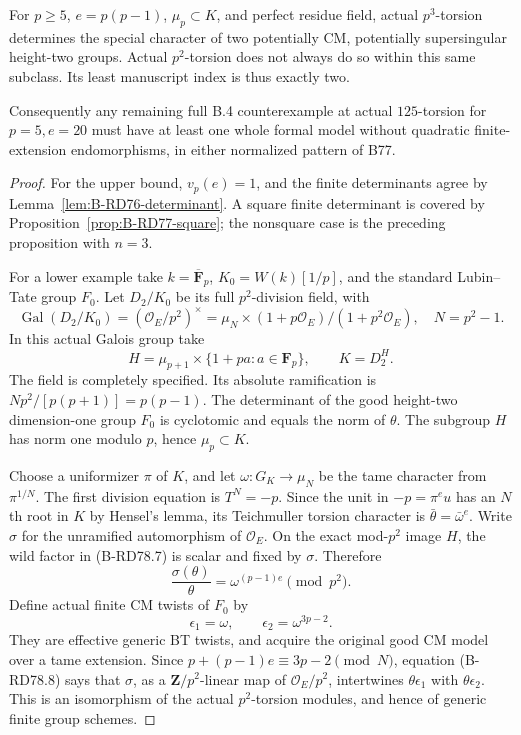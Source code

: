 \begin{theorem}
\label{thm:B-RD78}
For \(p\ge5\), \(e=p(p-1)\), \(\mu_p\subset K\), and
perfect residue field, actual \(p^3\)-torsion determines the
special character of two potentially CM, potentially supersingular
height-two groups. Actual \(p^2\)-torsion does not always do so
within this same subclass. Its least manuscript index is thus
exactly two.

Consequently any remaining full B.4 counterexample at actual
\(125\)-torsion for \(p=5,e=20\) must have at least one
whole formal model without quadratic finite-extension
endomorphisms, in either normalized pattern of B77.
\end{theorem}
\begin{proof}
For the upper bound, \(v_p(e)=1\), and the finite determinants
agree by Lemma~\ref{lem:B-RD76-determinant}. A square finite
determinant is covered by Proposition~\ref{prop:B-RD77-square};
the nonsquare case is the preceding proposition with \(n=3\).

For a lower example take \(k=\overline{\mathbf F}_p\),
\(K_0=W(k)[1/p]\), and the standard Lubin--Tate group \(F_0\).
Let \(D_2/K_0\) be its full \(p^2\)-division field, with
\[
 \operatorname{Gal}(D_2/K_0)
 = (\mathcal O_E/p^2)^\times
 =\mu_N\times(1+p\mathcal O_E)/(1+p^2\mathcal O_E),
 \quad N=p^2-1.
                                                        \tag{B-RD78.6}
\]
In this actual Galois group take
\[
 H=\mu_{p+1}\times
       \{1+pa:a\in\mathbf F_p\},\qquad K=D_2^H.
                                                        \tag{B-RD78.7}
\]
The field is completely specified. Its absolute ramification is
\(Np^2/[p(p+1)]=p(p-1)\). The determinant of the good
height-two dimension-one group \(F_0\) is cyclotomic and equals
the norm of \(\theta\). The subgroup \(H\) has norm one
modulo \(p\), hence \(\mu_p\subset K\).

Choose a uniformizer \(\pi\) of \(K\), and let
\(\omega:G_K\to\mu_N\) be the tame character from
\(\pi^{1/N}\). The first division equation is \(T^N=-p\).
Since the unit in \(-p=\pi^e u\) has an \(N\)th root in
\(K\) by Hensel's lemma, its Teichmuller torsion character is
\(\bar\theta=\bar\omega^e\). Write \(\sigma\) for the
unramified automorphism of \(\mathcal O_E\).
On the exact mod-\(p^2\) image \(H\), the wild factor in
(B-RD78.7) is scalar and fixed by \(\sigma\). Therefore
\[
 \frac{\sigma(\theta)}{\theta}
       =\omega^{(p-1)e}\pmod{p^2}.
                                                        \tag{B-RD78.8}
\]
Define actual finite CM twists of \(F_0\) by
\[
 \epsilon_1=\omega,\qquad
 \epsilon_2=\omega^{3p-2}.
                                                        \tag{B-RD78.9}
\]
They are effective generic BT twists, and acquire the original
good CM model over a tame extension. Since
\(p+(p-1)e\equiv3p-2\pmod N\), equation (B-RD78.8) says
that \(\sigma\), as a \(\mathbf Z/p^2\)-linear map of
\(\mathcal O_E/p^2\), intertwines
\(\theta\epsilon_1\) with \(\theta\epsilon_2\).
This is an isomorphism of the actual \(p^2\)-torsion modules,
and hence of generic finite group schemes.


\end{proof}
